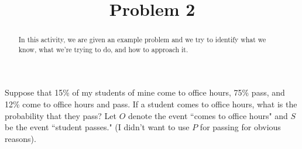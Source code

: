 \documentclass{ximera}
\title{Problem 2}
\begin{document}
      
\begin{abstract}
      
In this activity, we are given an example problem and we try to identify what we know, what we're trying to do, and how to approach it.
      
\end{abstract}
      
\maketitle
      
 
Suppose that 15\% of my students of mine come to office hours, 75\% pass, and 12\% come to office hours and pass.  If a student comes to office hours, what is the probability that they pass?  Let $O$ denote the event ``comes to office hours" and $S$ be the event ``student passes."  (I didn't want to use $P$ for passing for obvious reasons). 
 
\end{document}
